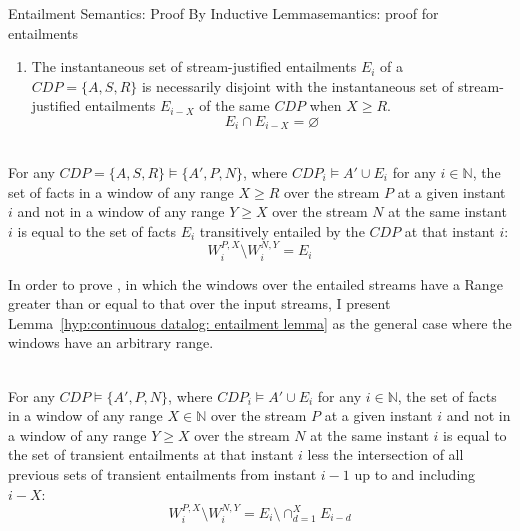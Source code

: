 \begin{nestedsection}{Entailment Semantics: Proof By Inductive Lemma}{semantics: proof for entailments}

	\begin{enumerate}\setcounter{enumi}{\thecontinuousDatalogAxioms}
		\item\label{axiom:continuous datalog: disjoint entailments}
			The instantaneous set of stream-justified entailments $E_{i}$ of a ${CDP = \{A,S,R\}}$ is necessarily disjoint with the instantaneous set of stream-justified entailments $E_{i-X}$ of the same ${CDP}$ when ${X \geq R}$.
			\begin{equation*}
				E_{i} \cap E_{i-X} = \varnothing
			\end{equation*}
		\setcounter{continuousDatalogAxioms}{\theenumi}
	\end{enumerate}	

	\begin{hyp} \hfill \\
		For any ${CDP = \{A,S,R\} \vDash \{A',P,N\}}$, where ${CDP_{i} \vDash A' \cup E_{i}}$ for any ${i \in \mathbb{N}}$, the set of facts in a window of any range ${X \geq R}$ over the stream $P$ at a given instant ${i}$ and not in a window of any range ${Y \geq X}$ over the stream $N$ at the same instant $i$ is equal to the set of facts $E_{i}$ transitively entailed by the ${CDP}$ at that instant $i$:
		\begin{equation*}
			W^{P,X}_{i} \setminus W^{N,Y}_{i} = E_{i}
		\end{equation*}
	\end{hyp}
	In order to prove , in which the windows over the entailed streams have a Range greater than or equal to that over the input streams, I present Lemma~\ref{hyp:continuous datalog: entailment lemma} as the general case where the windows have an arbitrary range.
	\begin{lem}\label{hyp:continuous datalog: entailment lemma} \hfill \\
		For any ${CDP \vDash \{A',P,N\}}$, where ${CDP_{i} \vDash A' \cup E_{i}}$ for any ${i \in \mathbb{N}}$, the set of facts in a window of any range ${X \in \mathbb{N}}$ over the stream $P$ at a given instant ${i}$ and not in a window of any range ${Y \geq X}$ over the stream $N$ at the same instant $i$ is equal to the set of transient entailments at that instant $i$ less the intersection of all previous sets of transient entailments from instant ${i-1}$ up to and including ${i-X}$:
		\begin{equation*}
			W^{P,X}_{i} \setminus W^{N,Y}_{i} = E_{i} \setminus \mathop{\cap}^{X}_{d=1} E_{i-d}
		\end{equation*}
	\end{lem}


\end{nestedsection}
